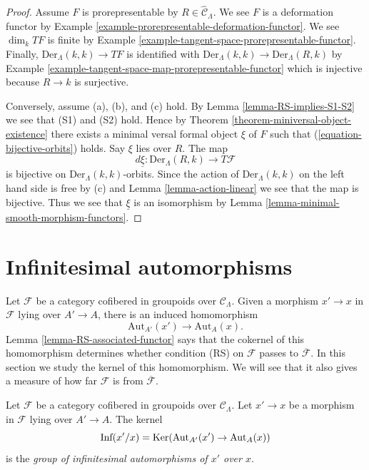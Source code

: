 \begin{proof}
Assume $F$ is prorepresentable by $R \in \widehat{\mathcal{C}}_\Lambda$.
We see $F$ is a deformation functor by
Example \ref{example-prorepresentable-deformation-functor}.
We see $\dim_k TF$ is finite by
Example \ref{example-tangent-space-prorepresentable-functor}.
Finally, $\text{Der}_\Lambda(k, k) \to TF$ is identified with
$\text{Der}_\Lambda(k, k) \to \text{Der}_\Lambda(R, k)$ by
Example \ref{example-tangent-space-map-prorepresentable-functor}
which is injective because $R \to k$ is surjective.

\medskip\noindent
Conversely, assume (a), (b), and (c) hold. By
Lemma \ref{lemma-RS-implies-S1-S2}
we see that (S1) and (S2) hold. Hence by
Theorem \ref{theorem-miniversal-object-existence}
there exists a minimal versal formal object $\xi$ of $F$ such that
(\ref{equation-bijective-orbits}) holds. Say $\xi$ lies over $R$.
The map
$$
d\underline{\xi} : \text{Der}_\Lambda(R, k) \to T\mathcal{F}
$$
is bijective on $\text{Der}_\Lambda(k, k)$-orbits. Since the action
of $\text{Der}_\Lambda(k, k)$ on the left hand side is free by (c) and
Lemma \ref{lemma-action-linear}
we see that the map is bijective. Thus we see that $\underline{\xi}$
is an isomorphism by
Lemma \ref{lemma-minimal-smooth-morphism-functors}.
\end{proof}




\section{Infinitesimal automorphisms}
\label{section-infinitesimal-automorphisms}

\noindent
Let $\mathcal{F}$ be a category cofibered in groupoids over
$\mathcal{C}_\Lambda$. Given a morphism $x' \to x$ in $\mathcal{F}$ lying over
$A' \to A$, there is an induced homomorphism
$$
\text{Aut}_{A'}(x') \to \text{Aut}_A(x).
$$
Lemma \ref{lemma-RS-associated-functor}
says that the cokernel of this homomorphism determines whether
condition (RS) on $\mathcal{F}$ passes to $\overline{\mathcal{F}}$.
In this section we study the kernel of this homomorphism. We will see
that it also gives a measure of how far $\mathcal{F}$
is from $\overline{\mathcal{F}}$.

\begin{definition}
\label{definition-relative-infinitesimal-auts}
Let $\mathcal{F}$ be a category cofibered in groupoids over $\mathcal
C_\Lambda$. Let $x' \to x$ be a morphism in $\mathcal{F}$ lying over
$A' \to A$. The kernel
$$
\text{Inf}(x'/x) = \mathop{\mathrm{Ker}}(\text{Aut}_{A'}(x') \to \text{Aut}_A(x))
$$
is the {\it group of infinitesimal automorphisms of $x'$ over $x$}.
\end{definition}

